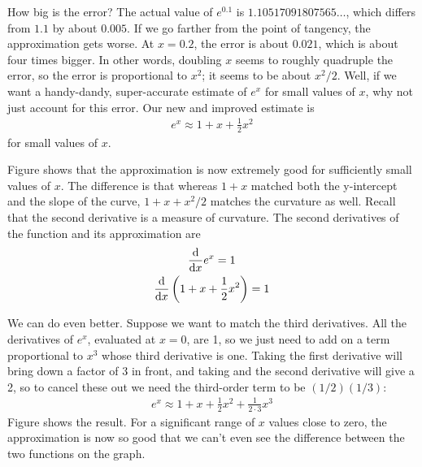 
How big is the error? The actual value of $e^{0.1}$ is $1.10517091807565\ldots$, which
differs from $1.1$ by about $0.005$. If we go farther from the point of tangency,
the approximation gets worse. At $x=0.2$, the error is about $0.021$, which is about
four times bigger. In other words, doubling $x$ seems to roughly quadruple the error,
so the error is proportional to $x^2$; it seems to be about $x^2/2$. Well, if we want a handy-dandy, super-accurate
estimate of $e^x$ for small values of $x$, why not just account for this
error. Our new and improved estimate is
\begin{align*}
  e^x \approx 1+x+\frac{1}{2}x^2
\end{align*}
for small values of $x$.


Figure  shows that the approximation is now extremely good for sufficiently small values of $x$.
The difference is that whereas $1+x$ matched both the y-intercept and the slope of the curve, $1+x+x^2/2$ matches
the curvature as well. Recall that the second derivative is a measure of curvature. The second derivatives of the
function and its approximation are
\begin{gather*}
  \frac{\textup{d}}{\textup{d} x} e^x = 1\\
  \frac{\textup{d}}{\textup{d} x} \left(1+x+\frac{1}{2}x^2\right) = 1
\end{gather*}

%
We can do even better. Suppose we want to match the third derivatives. All the derivatives of $e^x$, evaluated
at $x=0$, are 1, so we just need to add on a term proportional to $x^3$ whose third derivative is one. Taking the
first derivative will bring down a factor of 3 in front, and taking and the second derivative will give a 2, so
to cancel these out we need the third-order term to be $(1/2)(1/3)$:
\begin{align*}
  e^x \approx 1+x+\frac{1}{2}x^2+\frac{1}{2\cdot3}x^3
\end{align*}
Figure  shows the result. For a significant range of $x$ values close to zero, the approximation is
now so good that we can't even see the difference between the two functions on the graph.

